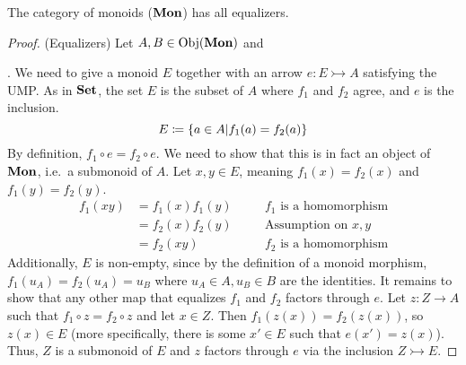\documentclass[a5paper]{article}
\begin{document}
\begin{theorem*}
	The category of monoids ($\operatorname{\mathbf{Mon}}$) has all equalizers.
\end{theorem*}
\begin{proof}
	(Equalizers) Let $A,B\in\operatorname{Obj}(\operatorname{\mathbf{Mon}})$ and
  . We need to
  give a monoid $E$ together with an arrow $e:E\rightarrowtail A$ satisfying
  the UMP. As in $\operatorname{\mathbf{Set}}$, the set $E$ is the subset of $A$ where $f_1$ and $f_2$
  agree, and $e$ is the inclusion.
  \begin{equation*}
    E\coloneqq\left\{a\in A|f_1(a)=f_2(a)\right\}
  \end{equation*}
  By definition, $f_1\circ e=f_2\circ e$. We need to show that this is in fact
  an object of $\operatorname{\mathbf{Mon}}$, i.e.\ a submonoid of $A$. Let $x,y\in E$, meaning
  $f_1(x)=f_2(x)$ and $f_1(y)=f_2(y)$.
  \begin{align*}
    f_1(xy)
    &= f_1(x)f_1(y)
    &&\quad f_1\text{ is a homomorphism} \\
    &= f_2(x)f_2(y)
    &&\quad \text{Assumption on }x,y \\
    &= f_2(xy)
    &&\quad f_2\text{ is a homomorphism}
  \end{align*}
  Additionally, $E$ is non-empty, since by the definition of a monoid morphism,
  $f_1(u_A)=f_2(u_A)=u_B$ where $u_A\in A,u_B\in B$ are the identities. It
  remains to show that any other map that equalizes $f_1$ and $f_2$ factors
  through $e$. Let $z:Z\to A$ such that $f_1\circ z=f_2\circ z$ and let
  $x\in Z$. Then $f_1(z(x))=f_2(z(x))$, so $z(x)\in E$ (more specifically, there
  is some $x'\in E$ such that $e(x')=z(x)$). Thus, $Z$ is a submonoid of $E$ and
  $z$ factors through $e$ via the inclusion $Z\rightarrowtail E$.
\end{proof}

\end{document}

